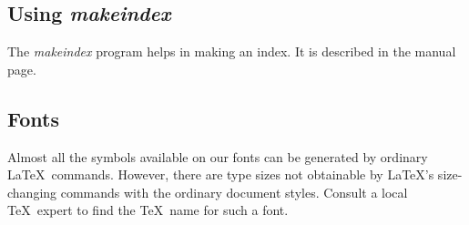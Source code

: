 \subsection{Using {\em makeindex\/}} \label{sec:makeindex}

The {\em makeindex\/} program helps in making an index.  It is 
described in the manual page.

\subsection{Fonts}

Almost all the symbols available on our fonts can be generated by
ordinary \LaTeX\ commands.  However, there are type sizes not
obtainable by \LaTeX's size-changing commands with the ordinary
document styles.  Consult a local \TeX\ expert to find the
\TeX\ name for such a font.

